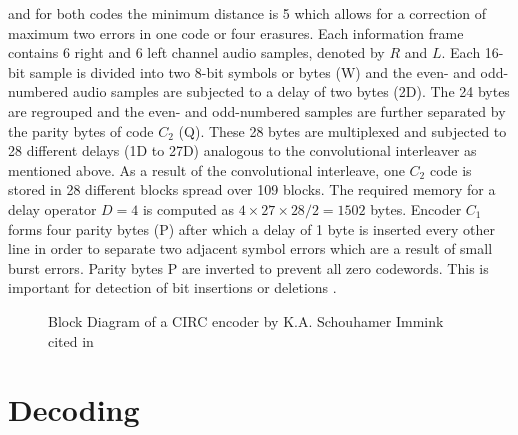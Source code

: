 \documentclass[../main.tex]{subfiles}
\begin{document}
    \noindent
    and for both codes the minimum distance is 5 which allows for a correction of maximum two errors in one code or four erasures. Each information frame contains 6 right and 6 left channel audio samples, denoted by $R$ and $L$. Each 16-bit sample is divided into two 8-bit symbols or bytes (W) and the even- and odd-numbered audio samples are subjected to a delay of two bytes (2D). The 24 bytes are regrouped and the even- and odd-numbered samples are further separated by the parity bytes of code $C_2$ (Q). These 28 bytes are multiplexed and subjected to 28 different delays (1D to 27D) analogous to the convolutional interleaver as mentioned above. As a result of the convolutional interleave, one $C_2$ code is stored in 28 different blocks spread over 109 blocks. The required memory for a delay operator $D=4$ is computed as $4 \times 27 \times 28/2 = 1502$ bytes. Encoder $C_1$ forms four parity bytes (P) after which a delay of 1 byte is inserted every other line in order to separate two adjacent symbol errors which are a result of small burst errors. Parity bytes P are inverted to prevent all zero codewords. This is important for detection of bit insertions or deletions \autocite{wicker1999reed}.

    \newpage
    \begin{figure}[h!tp]
        \centering
        [Placeholder]
        \caption{Block Diagram of a CIRC encoder by K.A. Schouhamer Immink cited in \autocite{wicker1999reed}}
        \label{fig:circ_encoder}
    \end{figure}
    \newpage


    \section{Decoding}
\end{document}
